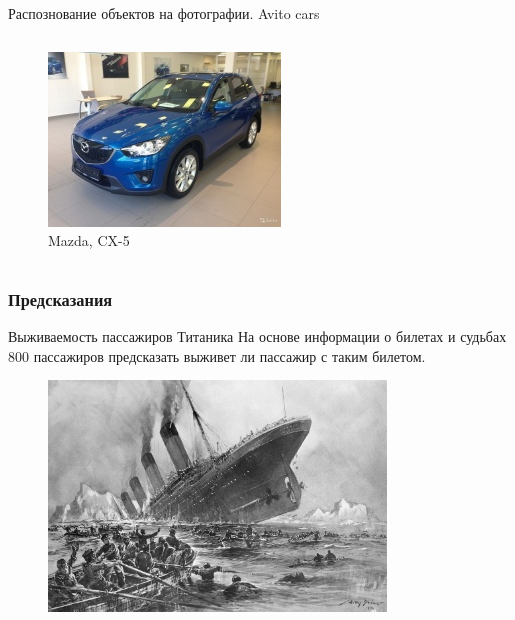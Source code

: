 \documentclass{beamer}
\begin{document}
\begin{frame}{Распознование объектов на фотографии. Avito cars}
\begin{columns}
\begin{column}{0.25\textwidth}
\begin{figure}
                \includegraphics[width=\textwidth]{fig/233px-Avito-2016_Mazda_CX-5.jpg}
                \caption{\tiny Mazda, CX-5}
            \end{figure}
        \end{column}
    \end{columns}
\end{frame}

\subsubsection{Предсказания}
\begin{frame}{Выживаемость пассажиров Титаника}
    На основе информации о билетах и судьбах 800 пассажиров предсказать выживет ли пассажир с таким билетом.
    \begin{figure}
        \includegraphics[width=0.8\textwidth]{fig/01titanic.jpg}
    \end{figure}
\end{frame}
\end{document}
